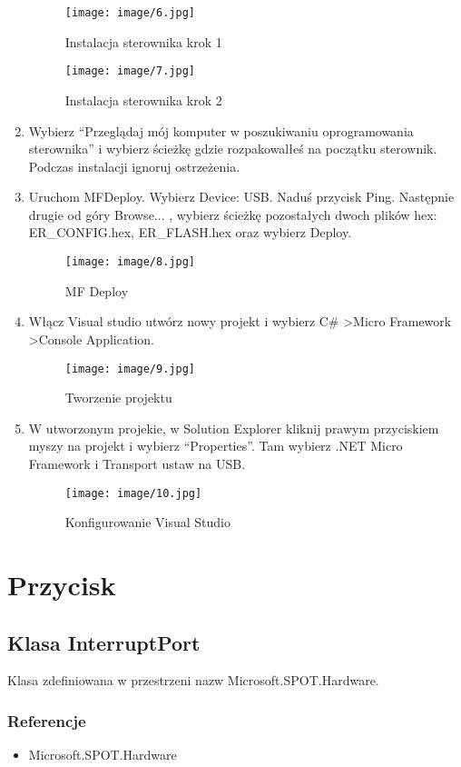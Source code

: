 \documentclass{article}
\begin{document}
\begin{enumerate}
\begin{figure}[H]
\texttt{[image: image/6.jpg]}
\caption{Instalacja sterownika krok 1}
\end{figure}
\begin{figure}[H]
\texttt{[image: image/7.jpg]}
\caption{Instalacja sterownika krok 2}
\end{figure}

\item Wybierz “Przeglądaj mój komputer w poszukiwaniu oprogramowania sterownika” i wybierz ścieżkę gdzie rozpakowalłeś na początku sterownik. Podczas instalacji ignoruj ostrzeżenia.
\item Uruchom MFDeploy. Wybierz Device: USB. Naduś przycisk Ping. Następnie drugie od góry Browse... , wybierz ścieżkę pozostałych dwoch plików hex: ER\_CONFIG.hex, ER\_FLASH.hex oraz wybierz Deploy.

\begin{figure}[H]
\texttt{[image: image/8.jpg]}
\caption{MF Deploy}
\end{figure}
\item Włącz Visual studio utwórz nowy projekt i wybierz C\# \textgreater Micro Framework \textgreater Console Application.

\begin{figure}[H]
\texttt{[image: image/9.jpg]}
\caption{Tworzenie projektu}
\end{figure}
\item W utworzonym projekie, w Solution Explorer kliknij prawym przyciskiem myszy na projekt i wybierz “Properties”. Tam wybierz .NET Micro Framework i Transport ustaw na USB.

\begin{figure}[H]
\texttt{[image: image/10.jpg]}
\caption{Konfigurowanie Visual Studio}
\end{figure}
\end{enumerate}

\section{Przycisk}
\subsection{Klasa InterruptPort}
Klasa zdefiniowana w przestrzeni nazw Microsoft.SPOT.Hardware.
\subsubsection{Referencje}
\begin{itemize}
\item Microsoft.SPOT.Hardware
\end{itemize}
\end{document}
